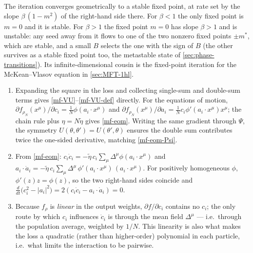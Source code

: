 \documentclass[11pt]{article}
\newcommand{\pd}{\partial}
\begin{document}
\begin{solution}[ex:cw]
The iteration converges geometrically to a stable fixed point, at rate set by the slope $\beta\,(1-m^2)$ of the right-hand side there. For $\beta<1$ the only fixed point is $m=0$ and it is stable. For $\beta>1$ the fixed point $m=0$ has slope $\beta>1$ and is unstable: any seed away from it flows to one of the two nonzero fixed points $\pm m^*$, which are stable, and a small $B$ selects the one with the sign of $B$ (the other survives as a stable fixed point too, the metastable state of \cref{sec:phase-transitions}). Its infinite-dimensional cousin is the fixed-point iteration for the McKean--Vlasov equation in \cref{sec:MFT-1hl}.
\end{solution}

\begin{solution}[ex:mf-eom]
\begin{enumerate}
  \item Expanding the square in the loss and collecting single-sum and double-sum terms gives \eqref{mf-VU}--\eqref{mf-VU-def} directly. For the equations of motion, $\pd f_{\rho_N}(x^\mu)/\pd c_i = \frac{1}{N} \phi(a_i\cdot x^\mu)$ and $\pd f_{\rho_N}(x^\mu)/\pd a_i = \frac{1}{N} c_i \phi'(a_i\cdot x^\mu)x^\mu$; the chain rule plus $\eta = N\tilde\eta$ gives \eqref{mf-eom}. Writing the same gradient through $\Psi$, the symmetry $U(\theta,\theta')=U(\theta',\theta)$ ensures the double sum contributes twice the one-sided derivative, matching \eqref{mf-eom-Psi}.
  \item From \eqref{mf-eom}: $c_i\dot c_i = -\tilde\eta\, c_i \sum_\mu \Delta^\mu \phi(a_i\cdot x^\mu)$ and $a_i\cdot \dot a_i = -\tilde\eta\, c_i \sum_\mu \Delta^\mu\, \phi'(a_i\cdot x^\mu)\,(a_i\cdot x^\mu)$. For positively homogeneous $\phi$, $\phi'(z)z = \phi(z)$, so the two right-hand sides coincide and $\frac{d}{dt}\big(c_i^2 - |a_i|^2\big) = 2(c_i\dot c_i - a_i\cdot\dot a_i) = 0$.
  \item Because $f_\rho$ is \emph{linear} in the output weights, $\pd f/\pd c_i$ contains no $c_i$; the only route by which $c_i$ influences $\dot c_i$ is through the mean field $\Delta^\mu$ --- i.e.\ through the population average, weighted by $1/N$. This linearity is also what makes the loss a quadratic (rather than higher-order) polynomial in each particle, i.e.\ what limits the interaction to be pairwise.
\end{enumerate}
\end{solution}
\end{document}
